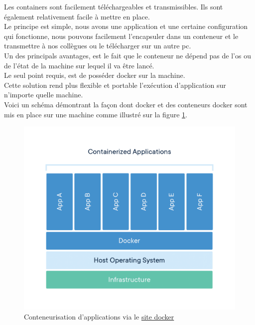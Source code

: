 \documentclass[
    iai, %
    il, %
]{heig-tb}
\begin{document}
Les containers sont facilement téléchargeables et transmissibles. Ils sont également relativement facile à mettre en place.\\
Le principe est simple, nous avons une application et une certaine configuration qui fonctionne, nous pouvons facilement l'encapsuler dans un \Gls{conteneur} et le transmettre à nos collègues ou le télécharger sur un autre pc.\\
Un des principals avantages, est le fait que le \Gls{conteneur} ne dépend pas de l'\Gls{os} ou de l'état de la machine sur lequel il va être lancé.\\
Le seul point requis, est de posséder \Gls{docker} sur la machine.\\
Cette solution rend plus flexible et portable l'exécution d'application sur n'importe quelle machine.\\
Voici un schéma démontrant la façon dont \Gls{docker} et des \Gls{conteneur}s \Gls{docker} sont mis en place sur une
machine comme illustré sur la figure \ref{docker-container-app}.

\begin{center}
    \begin{figure}
        \includegraphics[width=\textwidth]{./assets/figures/container-what-is-container.png}
        \caption[Conteneurisation d'applications]{Conteneurisation d'applications via
            le \href{https://www.docker.com/wp-content/uploads/2021/11/container-what-is-container.png}{site docker}
            \label{docker-container-app}}
    \end{figure}
\end{center}
\end{document}
